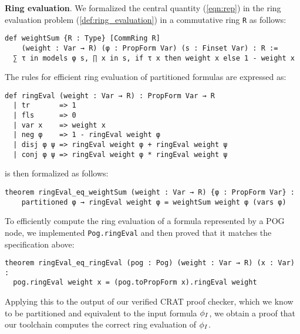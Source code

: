 \vspace{1em}\noindent
\textbf{Ring evaluation}. We formalized the central quantity (\ref{eqn:rep}) in the ring evaluation problem
(\cref{def:ring_evaluation}) in a commutative ring \lstinline{R} as follows:
\begin{lstlisting}
def weightSum {R : Type} [CommRing R]
    (weight : Var → R) (φ : PropForm Var) (s : Finset Var) : R :=
  ∑ τ in models φ s, ∏ x in s, if τ x then weight x else 1 - weight x
\end{lstlisting}
The rules for efficient ring evaluation of partitioned formulas are expressed as:
\begin{lstlisting}
def ringEval (weight : Var → R) : PropForm Var → R
  | tr       => 1
  | fls      => 0
  | var x    => weight x
  | neg φ    => 1 - ringEval weight φ
  | disj φ ψ => ringEval weight φ + ringEval weight ψ
  | conj φ ψ => ringEval weight φ * ringEval weight ψ
\end{lstlisting}
 is then formalized as follows:
\begin{lstlisting}
theorem ringEval_eq_weightSum (weight : Var → R) {φ : PropForm Var} :
    partitioned φ → ringEval weight φ = weightSum weight φ (vars φ)
\end{lstlisting}
To efficiently compute the ring evaluation of a formula represented by a POG node, we implemented
\lstinline{Pog.ringEval} and then proved that it matches the specification above:
\begin{lstlisting}
theorem ringEval_eq_ringEval (pog : Pog) (weight : Var → R) (x : Var) :
  pog.ringEval weight x = (pog.toPropForm x).ringEval weight
\end{lstlisting}
Applying this to the output of our verified CRAT proof checker, which we know to be partitioned
and equivalent to the input formula $\phi_I$, we obtain a proof that our toolchain computes
the correct ring evaluation of $\phi_I$.

